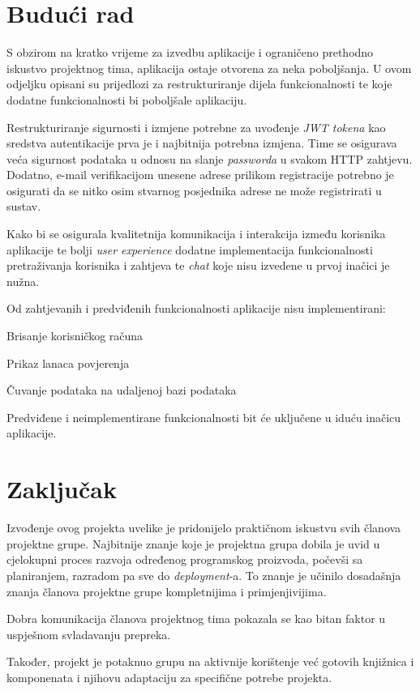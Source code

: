 		
		 \section{Budući rad}
		 S obzirom na kratko vrijeme za izvedbu aplikacije i ograničeno prethodno iskustvo projektnog tima, aplikacija ostaje otvorena za neka poboljšanja. U ovom odjeljku opisani su prijedlozi za restrukturiranje dijela funkcionalnosti te koje dodatne funkcionalnosti bi poboljšale aplikaciju.\newline 
		 
		 Restrukturiranje sigurnosti i izmjene potrebne za uvođenje \textit{JWT tokena} kao sredstva autentikacije prva je i najbitnija potrebna izmjena. Time se osigurava veća sigurnost podataka u odnosu na slanje \textit{passworda} u svakom HTTP zahtjevu. Dodatno, e-mail verifikacijom unesene adrese prilikom registracije potrebno je osigurati da se nitko osim stvarnog posjednika adrese ne može registrirati u sustav. \newline
		  
		 
		 Kako bi se osigurala kvalitetnija komunikacija i interakcija između korisnika aplikacije te bolji \textit{user experience} dodatne implementacija funkcionalnosti pretraživanja korisnika i zahtjeva te \textit{chat} koje nisu izvedene u prvoj inačici je nužna. \newline
		 
		 Od zahtjevanih i predviđenih funkcionalnosti aplikacije nisu implementirani:
		 \begin{packed_enum}
		 	
		 	\item Brisanje korisničkog računa
		 	\item Prikaz lanaca povjerenja
		 	\item Čuvanje podataka na udaljenoj bazi podataka 

		\end{packed_enum}		
		Predviđene i neimplementirane funkcionalnosti bit će uključene u iduću inačicu aplikacije. 	
		 
		 \eject
		 
		 \section{Zaključak}
		 Izvođenje ovog projekta uvelike je pridonijelo praktičnom iskustvu svih članova projektne grupe. Najbitnije znanje koje je projektna grupa dobila je uvid u cjelokupni proces razvoja određenog programskog proizvoda, počevši sa planiranjem, razradom pa sve do \textit{deployment}-a. To znanje je učinilo dosadašnja znanja članova projektne grupe kompletnijima i primjenjivijima. 
		 
		 Dobra komunikacija članova projektnog tima pokazala se kao bitan faktor u uspješnom svladavanju prepreka. 
		 
		 Također, projekt je potaknuo grupu na aktivnije korištenje već gotovih knjižnica i komponenata i njihovu adaptaciju za specifične potrebe projekta.
		 \eject
		 
		 
		
		\eject 